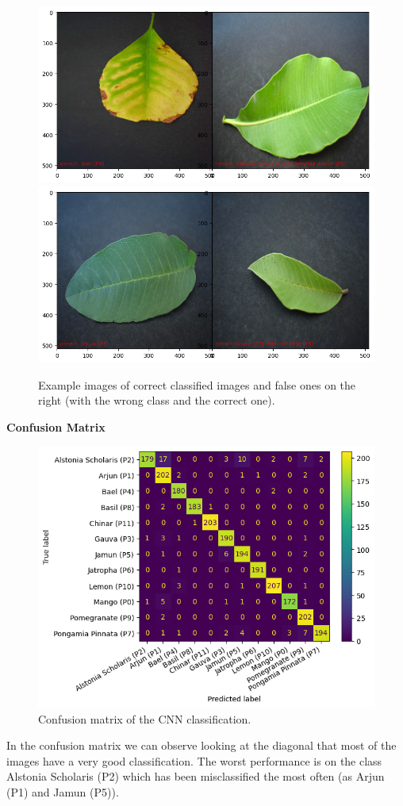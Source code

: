 \documentclass[UTF-8]{article}
\begin{document}
\begin{figure}[H]
	\centering
	\includegraphics[width=0.6\linewidth]{_images/CNNcorrect_falseImg2}
	\includegraphics[width=0.6\linewidth]{_images/CNNcorrect_falseImg}
	\caption{Example images of correct classified images and false ones on the right (with the wrong class and the correct one).}
	\label{fig:cnncorrectfalseimg2}
\end{figure}

\textbf{Confusion Matrix}
\begin{figure}[H]
	\centering
	\includegraphics[width=0.7\linewidth]{_images/CNNConfusionMat}
	\caption{Confusion matrix of the CNN classification.}
	\label{fig:cnnconfusionmat}
\end{figure}
In the confusion matrix we can observe looking at the diagonal that most of the images have a very good classification. The worst performance is on the class Alstonia Scholaris (P2) which has been misclassified the most often (as Arjun (P1) and Jamun (P5)).\\
\end{document}
